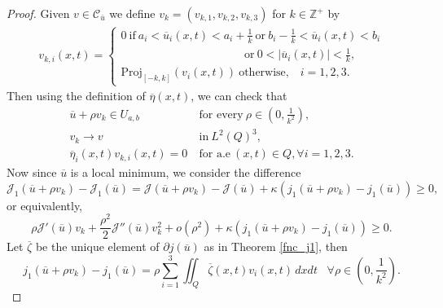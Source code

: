 \documentclass[reqno]{amsart}
\begin{document}
	\begin{proof}
		Given $v \in \mathcal{C}_{\overline{u}}$ we define $v_k=(v_{k,1}, v_{k,2}, v_{k,3})$ for $k\in \mathbb{Z}^+$ by
		\begin{equation*}
			\begin{aligned}
				v_{k,i}(x,t)=\begin{cases}
					0 \ \text{if} \ a_i < \overline{u}_i(x,t) < a_i + \frac{1}{k} \ \text{or} \ b_i - \frac{1}{k} < \overline{u}_i(x,t) < b_i \\ \hspace{130pt} \text{or} \ 0< \vert \overline{u}_i(x,t)\vert < \frac{1}{k},\\
					\text{Proj}_{[-k,k]} (v_i(x,t)) \ \text{otherwise}, \hspace{10pt} i=1,2,3.
				\end{cases}
			\end{aligned}
		\end{equation*}
		Then using the definition of $\overline{\eta}(x,t)$, we can check that
		\begin{align*}
			\overline{u}+ \rho v_k \in U_{a,b} \ &\text{for every} \ \rho \in \left( 0, \frac{1}{k^2} \right), \\
			v_k \rightarrow v \ &\text{in} \ L^2(Q)^3, \\
			\overline{\eta}_i(x,t) v_{k,i}(x,t) = 0 \ &\text{for a.e} \ (x,t)\in Q, \forall i =1,2,3.
		\end{align*}
		Now since $\overline{u}$ is a local minimum, we consider the difference
		\begin{equation*}
			\mathcal{J}_1 (\overline{u}+\rho v_k) - \mathcal{J}_1(\overline{u}) = \mathcal{J}(\overline{u}+\rho v_k) - \mathcal{J}(\overline{u}) + \kappa(j_1(\overline{u}+\rho v_k) - j_1(\overline{u})) \geq 0,
		\end{equation*}
		or equivalently,
		\begin{equation*}
			\rho \mathcal{J}'(\overline{u})v_k + \frac{\rho^2}{2} \mathcal{J}''(\overline{u})v_k^2 + o(\rho^2) +\kappa(j_1(\overline{u}+\rho v_k) - j_1(\overline{u})) \geq 0.
		\end{equation*}
		Let $\overline{\zeta}$ be the unique element of $\partial j(\overline{u})$ as in Theorem \ref{fnc_j1}, then
		\begin{equation} \label{5.2.1}
			j_1(\overline{u}+\rho v_k) - j_1(\overline{u}) = \rho \sum_{i=1}^3 \iint_Q \overline{\zeta}(x,t) v_i(x,t) \, dxdt \hspace{10pt} \forall \rho \in \left( 0, \frac{1}{k^2} \right).
		\end{equation}

\end{proof}
\end{document}
